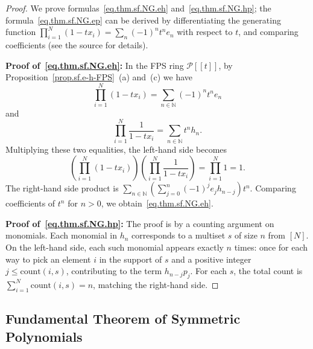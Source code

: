 \begin{proof}
We prove formulas~\eqref{eq.thm.sf.NG.eh} and~\eqref{eq.thm.sf.NG.hp}; the formula~\eqref{eq.thm.sf.NG.ep}
can be derived by differentiating the generating function
$\prod_{i=1}^N (1 - t x_i) = \sum_n (-1)^n t^n e_n$
with respect to $t$, and comparing coefficients (see the source for details).

\textbf{Proof of~\eqref{eq.thm.sf.NG.eh}:}
In the FPS ring $\mathcal{P}[[t]]$, by Proposition~\ref{prop.sf.e-h-FPS}~(a) and~(c) we have
\[
\prod_{i=1}^{N} (1 - t x_i) = \sum_{n \in \mathbb{N}} (-1)^n t^n e_n
\]
and
\[
\prod_{i=1}^{N} \frac{1}{1 - t x_i} = \sum_{n \in \mathbb{N}} t^n h_n.
\]
Multiplying these two equalities, the left-hand side becomes
\[
\left(\prod_{i=1}^{N} (1 - t x_i)\right) \left(\prod_{i=1}^{N} \frac{1}{1 - t x_i}\right)
= \prod_{i=1}^{N} 1 = 1.
\]
The right-hand side product is
$\sum_{n \in \mathbb{N}} \left(\sum_{j=0}^n (-1)^j e_j h_{n-j}\right) t^n$.
Comparing coefficients of $t^n$ for $n > 0$, we obtain~\eqref{eq.thm.sf.NG.eh}.

\textbf{Proof of~\eqref{eq.thm.sf.NG.hp}:}
The proof is by a counting argument on monomials.
Each monomial in $h_n$ corresponds to a multiset $s$ of size $n$ from $[N]$.
On the left-hand side, each such monomial appears exactly $n$ times:
once for each way to pick an element $i$ in the support of $s$
and a positive integer $j \leq \text{count}(i, s)$,
contributing to the term $h_{n-j} p_j$.
For each $s$, the total count is $\sum_{i=1}^N \text{count}(i, s) = n$, matching the right-hand side.
\end{proof}

\subsection{Fundamental Theorem of Symmetric Polynomials}

